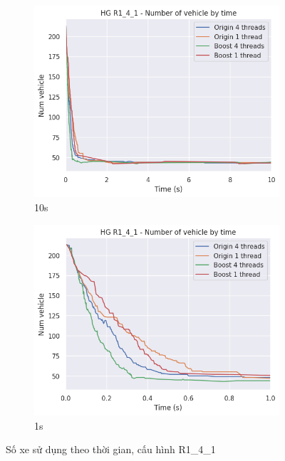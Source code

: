 \begin{figure}[H] %
  \label{fig:perf_ct_r1_4}
  \begin{subfigure}{.5\textwidth}
    \centering
    \includegraphics[width=1\linewidth]{figures/nv_time_10s_R1_4_1.png}
    \caption{10s}
    \label{fig:perf_ct_r1_4_10s}
  \end{subfigure}%
  \begin{subfigure}{.5\textwidth}
    \centering
    \includegraphics[width=1\linewidth]{figures/nv_time_1s_R1_4_1.png}
    \caption{1s}
    \label{fig:perf_ct_r1_4_1s}
  \end{subfigure}
  \caption{Số xe sử dụng theo thời gian, cấu hình R1\_4\_1}
\end{figure}

